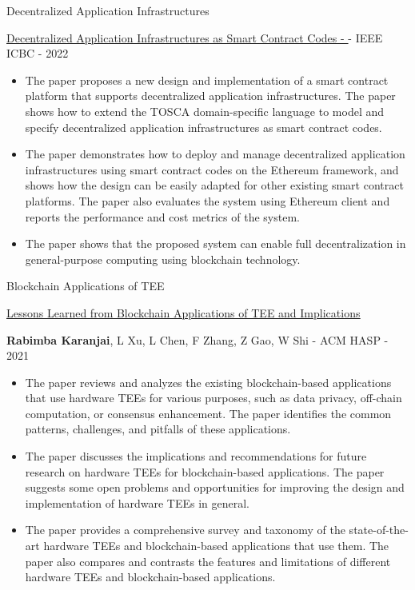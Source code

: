 \documentclass[10pt,aspectratio=169]{beamer}
\begin{document}
\begin{frame}[fragile]{Decentralized Application Infrastructures}

{\href{https://ieeexplore.ieee.org/document/9805493}{\underline{Decentralized Application Infrastructures as Smart Contract Codes - }}}
    {} - {IEEE ICBC} - {2022}
\begin{itemize} \item The paper proposes a new design and implementation of a smart contract platform that supports decentralized application infrastructures. The paper shows how to extend the TOSCA domain-specific language to model and specify decentralized application infrastructures as smart contract codes. \item The paper demonstrates how to deploy and manage decentralized application infrastructures using smart contract codes on the Ethereum framework, and shows how the design can be easily adapted for other existing smart contract platforms. The paper also evaluates the system using Ethereum client and reports the performance and cost metrics of the system. \item The paper shows that the proposed system can enable full decentralization in general-purpose computing using blockchain technology.  \end{itemize}
\end{frame}

\begin{frame}[fragile]{Blockchain Applications of TEE}

{\href{https://dl.acm.org/doi/abs/10.1145/3505253.3505259}{\underline{Lessons Learned from Blockchain Applications of TEE and Implications}}} 

{\textbf{Rabimba Karanjai}, L Xu, L Chen, F Zhang, Z Gao, W Shi} - {ACM HASP} - {2021}
\begin{itemize} \item The paper reviews and analyzes the existing blockchain-based applications that use hardware TEEs for various purposes, such as data privacy, off-chain computation, or consensus enhancement. The paper identifies the common patterns, challenges, and pitfalls of these applications. \item The paper discusses the implications and recommendations for future research on hardware TEEs for blockchain-based applications. The paper suggests some open problems and opportunities for improving the design and implementation of hardware TEEs in general. \item The paper provides a comprehensive survey and taxonomy of the state-of-the-art hardware TEEs and blockchain-based applications that use them. The paper also compares and contrasts the features and limitations of different hardware TEEs and blockchain-based applications. \end{itemize}
\end{frame}
\end{document}
